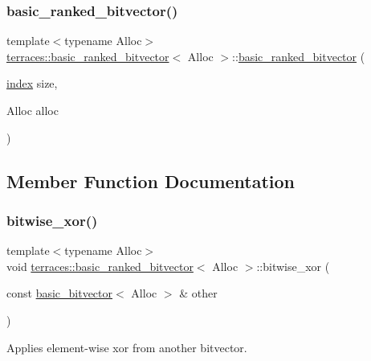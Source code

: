 \subsubsection{\texorpdfstring{basic\+\_\+ranked\+\_\+bitvector()}{basic\_ranked\_bitvector()}}
{\footnotesize\ttfamily template$<$typename Alloc$>$ \\
\hyperlink{classterraces_1_1basic__ranked__bitvector}{terraces\+::basic\+\_\+ranked\+\_\+bitvector}$<$ Alloc $>$\+::\hyperlink{classterraces_1_1basic__ranked__bitvector}{basic\+\_\+ranked\+\_\+bitvector} (\begin{DoxyParamCaption}\item[{\hyperlink{namespaceterraces_adbc33ccb543d1634e96d0eb02e472c77}{index}}]{size,  }\item[{Alloc}]{alloc }\end{DoxyParamCaption})\hspace{0.3cm}{\ttfamily [inline]}}



\subsection{Member Function Documentation}
\mbox{\label{classterraces_1_1basic__ranked__bitvector_af574d03b47d01094a2b93569e7dda53e}} 
\subsubsection{\texorpdfstring{bitwise\+\_\+xor()}{bitwise\_xor()}}
{\footnotesize\ttfamily template$<$typename Alloc$>$ \\
void \hyperlink{classterraces_1_1basic__ranked__bitvector}{terraces\+::basic\+\_\+ranked\+\_\+bitvector}$<$ Alloc $>$\+::bitwise\+\_\+xor (\begin{DoxyParamCaption}\item[{const \hyperlink{classterraces_1_1basic__bitvector}{basic\+\_\+bitvector}$<$ Alloc $>$ \&}]{other }\end{DoxyParamCaption})}

Applies element-\/wise xor from another bitvector. \mbox{\label{classterraces_1_1basic__ranked__bitvector_a800cac4946ede86d99fd361e8dabbf02}} 
